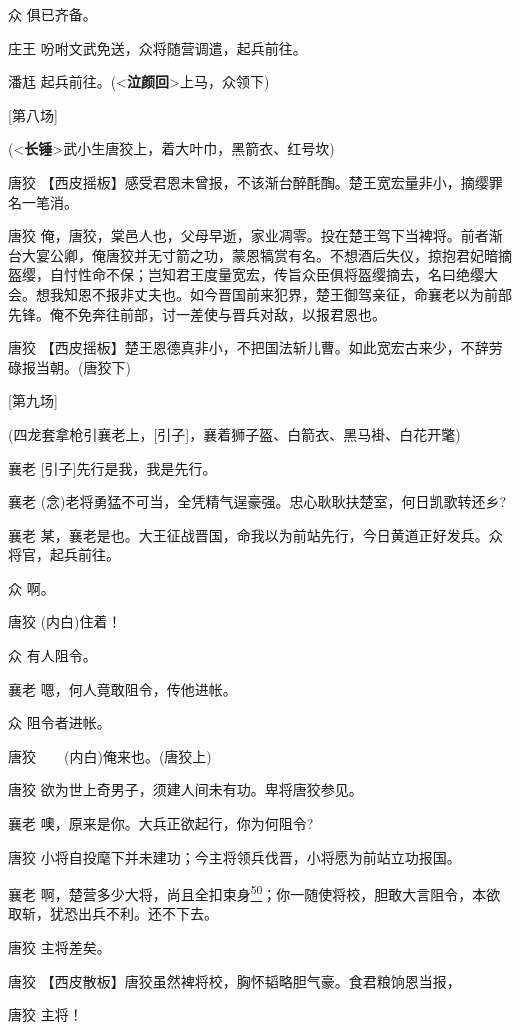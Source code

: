 众 俱已齐备。

庄王 吩咐文武免送，众将随营调遣，起兵前往。

潘尪 起兵前往。(\textless{}\textbf{泣颜回}\textgreater{}上马，众领下)

{[}第八场{]}

(\textless{}\textbf{长锤}\textgreater{}武小生唐狡上，着大叶巾，黑箭衣、红号坎)

唐狡
【西皮摇板】感受君恩未曾报，不该渐台醉酕醄。楚王宽宏量非小，摘缨罪名一笔消。

唐狡
俺，唐狡，棠邑人也，父母早逝，家业凋零。投在楚王驾下当裨将。前者渐台大宴公卿，俺唐狡并无寸箭之功，蒙恩犒赏有名。不想酒后失仪，掠抱君妃暗摘盔缨，自忖性命不保；岂知君王度量宽宏，传旨众臣俱将盔缨摘去，名曰绝缨大会。想我知恩不报非丈夫也。如今晋国前来犯界，楚王御驾亲征，命襄老以为前部先锋。俺不免奔往前部，讨一差使与晋兵对敌，以报君恩也。

唐狡
【西皮摇板】楚王恩德真非小，不把国法斩儿曹。如此宽宏古来少，不辞劳碌报当朝。(唐狡下)

{[}第九场{]}

(四龙套拿枪引襄老上，{[}引子{]}，襄着狮子盔、白箭衣、黑马褂、白花开氅)

襄老 {[}引子{]}先行是我，我是先行。

襄老 (念)老将勇猛不可当，全凭精气逞豪强。忠心耿耿扶楚室，何日凯歌转还乡?

襄老
某，襄老是也。大王征战晋国，命我以为前站先行，今日黄道正好发兵。众将官，起兵前往。

众 啊。

唐狡 (内白)住着！

众 有人阻令。

襄老 嗯，何人竟敢阻令，传他进帐。

众 阻令者进帐。

唐狡　　(内白)俺来也。(唐狡上)

唐狡 欲为世上奇男子，须建人间未有功。卑将唐狡参见。

襄老 噢，原来是你。大兵正欲起行，你为何阻令?

唐狡 小将自投麾下并未建功；今主将领兵伐晋，小将愿为前站立功报国。

襄老
啊，楚营多少大将，尚且全扣束身\protect\hyperlink{fn50}{\textsuperscript{50}}；你一随使将校，胆敢大言阻令，本欲取斩，犹恐出兵不利。还不下去。

唐狡 主将差矣。

唐狡 【西皮散板】唐狡虽然裨将校，胸怀韬略胆气豪。食君粮饷恩当报，

唐狡 主将！

